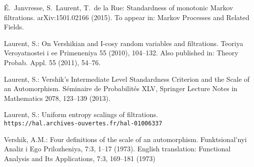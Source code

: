 \documentclass[12pt,a4paper]{article}
\begin{document}
\begin{thebibliography}{99.}

\'E.~Janvresse, S.~Laurent, T.~de la Rue: 
Standardness of monotonic Markov filtrations. 
	arXiv:1501.02166 (2015). 
To appear in: Markov Processes and Related Fields. 


 Laurent, S.: 
On Vershikian and I-cosy random variables and filtrations.
Teoriya Veroyatnostei i ee Primeneniya 55 (2010), 104--132. 
Also published in: Theory Probab. Appl. 55 (2011), 54--76.


Laurent, S.: 
Vershik's Intermediate Level Standardness Criterion and the Scale of an Automorphism. 
S\'eminaire de Probabilit\'es XLV,
Springer Lecture Notes in Mathematics 2078,
123--139 (2013).

Laurent, S.: 
Uniform entropy scalings of filtrations. \\
\verb+https://hal.archives-ouvertes.fr/hal-01006337+ 


Vershik, A.M.: 
Four definitions of the scale of an automorphism. 
Funktsional'nyi Analiz i Ego Prilozheniya, 7:3, 
1--17 (1973). 
English translation:    
Functional Analysis and Its Applications, 7:3, 169--181 (1973)



\end{thebibliography}
\end{document}
